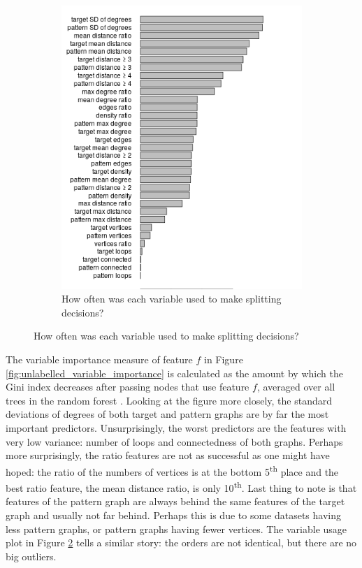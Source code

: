 \documentclass{l4proj}
\theoremstyle{definition}
\theoremstyle{remark}
\begin{document}
\begin{figure}
\begin{subfigure}[t]{0.49\textwidth}
    \includegraphics[width=\textwidth]{images/unlabelled_var_used.png}
    \caption{How often was each variable used to make splitting decisions?}
    \label{fig:unlabelled_var_used}
  \end{subfigure}
\end{figure}

The variable importance measure of feature $f$ in Figure
\ref{fig:unlabelled_variable_importance} is calculated as the amount by which
the Gini index decreases after passing nodes that use feature $f$, averaged over
all trees in the random forest \cite{James:2014:ISL:2517747}. Looking at the
figure more closely, the standard deviations of degrees of both target and
pattern graphs are by far the most important predictors. Unsurprisingly, the
worst predictors are the features with very low variance: number of loops and
connectedness of both graphs. Perhaps more surprisingly, the ratio features are
not as successful as one might have hoped: the ratio of the numbers of vertices
is at the bottom 5\textsuperscript{th} place and the best ratio feature, the
mean distance ratio, is only 10\textsuperscript{th}. Last thing to note is that
features of the pattern graph are always behind the same features of the target
graph and usually not far behind. Perhaps this is due to some datasets having
less pattern graphs, or pattern graphs having fewer vertices. The variable usage
plot in Figure \ref{fig:unlabelled_var_used} tells a similar story: the orders
are not identical, but there are no big outliers.
\end{document}
